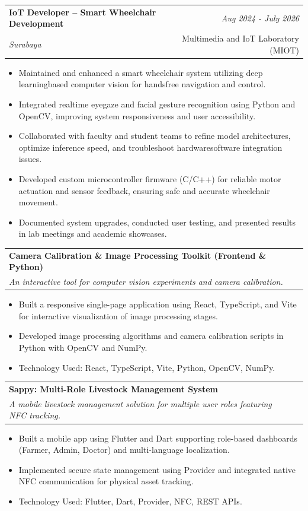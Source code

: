 \documentclass[a4paper,11pt]{article}
\makeatletter
\newcommand{\resumeSubheading}[4]{
\vspace{0.5mm}\item
    \begin{tabular*}{0.98\textwidth}[t]{l@{\extracolsep{\fill}}r}
        \textbf{#1} & \textit{\footnotesize{#4}} \\
        \textit{\footnotesize{#3}} &  \footnotesize{#2}\\
    \end{tabular*}
    \vspace{-2.4mm}
}
\newcommand{\resumeProject}[4]{
\vspace{0.5mm}\item
    \begin{tabular*}{0.98\textwidth}[t]{l@{\extracolsep{\fill}}r}
        \textbf{#1} & \textit{\footnotesize{#3}} \\
        \footnotesize{\textit{#2}} & \footnotesize{#4}
    \end{tabular*}
    \vspace{-2.4mm}
    \par
}
\newcommand{\resumeItemListStart}{\begin{justify}\begin{itemize}[leftmargin=3ex, rightmargin=2ex, noitemsep,labelsep=1.2mm,itemsep=0mm]\small}
\newcommand{\resumeItemListEnd}{\end{itemize}\end{justify}\vspace{-2mm}}
\makeatother
\begin{document}
\resumeSubheading
{IoT Developer – Smart Wheelchair Development}{Multimedia and IoT Laboratory (MIOT)}
{Surabaya}{Aug 2024 \-- July 2026}
\resumeItemListStart
\item {Maintained and enhanced a smart wheelchair system utilizing deep learning\-based computer vision for hands\-free navigation and control.}
\item {Integrated real\-time eye\-gaze and facial gesture recognition using Python and OpenCV, improving system responsiveness and user accessibility.}
\item {Collaborated with faculty and student teams to refine model architectures, optimize inference speed, and troubleshoot hardware\-software integration issues.}
\item {Developed custom microcontroller firmware (C/C++) for reliable motor actuation and sensor feedback, ensuring safe and accurate wheelchair movement.}
\item {Documented system upgrades, conducted user testing, and presented results in lab meetings and academic showcases.}
\resumeItemListEnd

\resumeProject
{Camera Calibration \& Image Processing Toolkit (Frontend \& Python)}
{An interactive tool for computer vision experiments and camera calibration.}
{}
{}
\resumeItemListStart
\item {Built a responsive single-page application using React, TypeScript, and Vite for interactive visualization of image processing stages.}
\item {Developed image processing algorithms and camera calibration scripts in Python with OpenCV and NumPy.}
\item {Technology Used: React, TypeScript, Vite, Python, OpenCV, NumPy.}
\resumeItemListEnd
\vspace{-2mm}

\resumeProject
{Sappy: Multi-Role Livestock Management System}
{A mobile livestock management solution for multiple user roles featuring NFC tracking.}
{}
{}
\resumeItemListStart
\item {Built a mobile app using Flutter and Dart supporting role-based dashboards (Farmer, Admin, Doctor) and multi-language localization.}
\item {Implemented secure state management using Provider and integrated native NFC communication for physical asset tracking.}
\item {Technology Used: Flutter, Dart, Provider, NFC, REST APIs.}
\resumeItemListEnd
\end{document}
